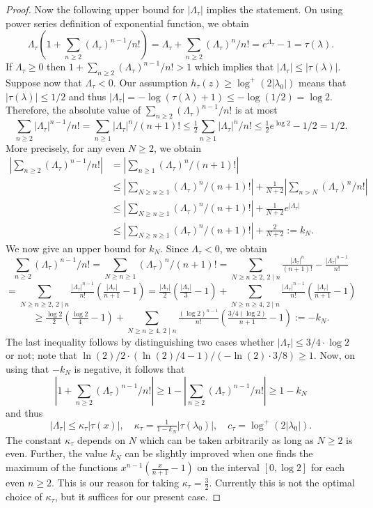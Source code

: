 \documentclass[11pt]{report}
\theoremstyle{definition}
\begin{document}
\begin{proof}
Now the following upper bound for $|\Lambda_\tau|$ implies the statement. On using power series definition of exponential function, we obtain $$\Lambda_\tau(1+\sum_{n\geq 2} (\Lambda_\tau)^{n-1}/n!)=\Lambda_\tau+\sum_{n\geq 2} (\Lambda_\tau)^n/n!=e^{\Lambda_\tau}-1=\tau(\lambda).$$
If $\Lambda_\tau\geq 0$ then $1+\sum_{n\geq 2} (\Lambda_\tau)^{n-1}/n!>1$ which implies that $|\Lambda_\tau|\leq |\tau(\lambda)|.$ Suppose now that $\Lambda_\tau<0$. Our assumption $h_{\tau}(z)\geq \log^+ (2|\lambda_0|)$ means that $|\tau(\lambda)|\leq 1/2$ and thus $|\Lambda_\tau|=-\log (\tau(\lambda)+1)\leq -\log(1/2)=\log 2.$ Therefore, the absolute value of $\sum_{n\geq 2} (\Lambda_\tau)^{n-1}/n!$ is at most $$\sum_{n\geq 2} |\Lambda_\tau|^{n-1}/n!=\sum_{n\geq 1} |\Lambda_\tau|^{n}/(n+1)!\leq \tfrac{1}{2}\sum_{n\geq 1} |\Lambda_\tau|^{n}/n!\leq
\tfrac{1}{2}e^{\log 2}-1/2=1/2.$$
More precisely, for any even $N\geq 2$, we obtain
\begin{align*}
|\sum_{n\geq 2} (\Lambda_\tau)^{n-1}/n!|
	& =|\sum_{n\geq 1} (\Lambda_\tau)^{n}/(n+1)!|\\
	&\leq |\sum_{N\geq n\geq 1} (\Lambda_\tau)^{n}/(n+1)!|+\tfrac{1}{N+2}|\sum_{n>N} (\Lambda_\tau)^{n}/n!|\\
	&\leq |\sum_{N\geq n\geq 1} (\Lambda_\tau)^{n}/(n+1)!|+\tfrac{1}{N+2}e^{|\Lambda_\tau|}\\
	& \leq |\sum_{N\geq n\geq 1} (\Lambda_\tau)^{n}/(n+1)!|+\tfrac{2}{N+2}:=k_N.
\end{align*}
We now give an upper bound for $k_N$. Since $\Lambda_\tau<0$, we obtain
$$\sum_{n\geq 2} (\Lambda_\tau)^{n-1}/n!=\sum_{N\geq n\geq 1} (\Lambda_\tau)^{n}/(n+1)!=\sum_{N\geq n\geq 2, \, 2\mid n}\tfrac{|\Lambda_\tau|^n}{(n+1)!}-\tfrac{|\Lambda_\tau|^{n-1}}{n!}$$
$$=\sum_{N\geq n\geq 2, \, 2\mid n}\tfrac{|\Lambda_\tau|^{n-1}}{n!}(\tfrac{|\Lambda_\tau|}{n+1}-1)=\tfrac{|\Lambda_\tau|}{2}(\tfrac{|\Lambda_\tau|}{3}-1)+\sum_{N\geq n\geq 4, \, 2\mid n}\tfrac{|\Lambda_\tau|^{n-1}}{n!}(\tfrac{|\Lambda_\tau|}{n+1}-1)$$
$$\geq \tfrac{\log 2}{2}(\tfrac{\log 2}{4}-1)+\sum_{N\geq n\geq 4, \, 2\mid n}\tfrac{(\log 2)^{n-1}}{n!}(\tfrac{3/4(\log 2)}{n+1}-1):=-k_N.$$
The last inequality follows by distinguishing two cases whether  $|\Lambda_\tau|\leq 3/4\cdot \log 2$ or not; note that $\ln(2)/2\cdot(\ln(2)/4-1)/(-\ln (2)\cdot3/8)\geq 1$.  Now, on using that $-k_N$ is negative, it follows that
\[|1+\sum_{n\geq 2} (\Lambda_\tau)^{n-1}/n!|\geq 1-|\sum_{n\geq 2} (\Lambda_\tau)^{n-1}/n!|\geq 1-k_N\]
and thus
$$|\Lambda_\tau|\leq \kappa_\tau|\tau(x)|, \quad \kappa_\tau=\tfrac{1}{1-k_N}|\tau(\lambda_0)|,  \quad c_\tau=\log^+(2|\lambda_0|).$$
The constant $\kappa_\tau$ depends on $N$ which can be taken arbitrarily as long as $N\geq 2$ is even. Further, the value $k_N$ can be slightly improved when one finds the maximum of the functions $x^{n-1}(\tfrac{x}{n+1}-1)$ on the interval $[0,\log 2]$ for each even $n\geq 2$. This is our reason for taking $\kappa_{\tau} = \frac{3}{2}$. Currently this is not the optimal choice of $\kappa_{\tau}$, but it suffices for our present case.


\end{proof}
\end{document}
